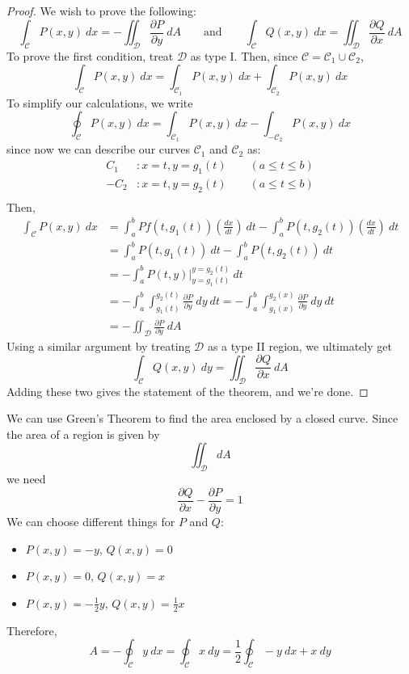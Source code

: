 \documentclass[12pt]{article}
\begin{document}
\begin{proof}
We wish to prove the following:
\[ \int_{\mathcal{C}}P(x,y) \ dx = - \iint_{\mathcal{D}} \frac{\partial P}{\partial y} \ dA \qquad \text{and} \qquad \int_{\mathcal{C}}Q(x,y) \ dx = \iint_{\mathcal{D}}\frac{\partial Q}{\partial x} \ dA \]
To prove the first condition, treat $\mathcal{D}$ as type I. Then, since $\mathcal{C} = \mathcal{C}_1 \cup \mathcal{C}_2$, \[ \int_{\mathcal{C}}P(x,y) \ dx = \int_{\mathcal{C}_1}P(x,y) \ dx + \int_{\mathcal{C}_2}P(x,y) \ dx \]
To simplify our calculations, we write \[ \oint_{\mathcal{C}}P(x,y) \ dx = \int_{\mathcal{C}_1}P(x,y) \ dx - \int_{-\mathcal{C}_2}P(x,y) \ dx \]
since now we can describe our curves $\mathcal{C}_1$ and $\mathcal{C}_2$ as:
\[
\begin{aligned}
C_1&: x = t, y = g_1(t) \qquad (a \le t \le b) \\
-C_2&: x = t, y = g_2(t) \qquad (a \le t \le b) \\
\end{aligned}
\]
Then,
\[
\begin{aligned}
\int_{\mathcal{C}}P(x,y) \ dx &= \int_a^bPf(t,g_1(t)) \left(\frac{dx}{dt}\right) \ dt - \int_a^b P(t,g_2(t))\left(\frac{dx}{dt}\right) \ dt \\
&= \int_a^b P(t,g_1(t)) \ dt - \int_a^b P(t,g_2(t)) \ dt \\
&= -\int_a^b P(t,y)\biggl|_{y=g_1(t)}^{y=g_2(t)} \ dt \\
&= -\int_a^b \int_{g_1(t)}^{g_2(t)}\frac{\partial P}{\partial y} \ dy \ dt = -\int_a^b \int_{g_1(x)}^{g_2(x)}\frac{\partial P}{\partial y} \ dy \ dt \\
&= -\iint_{\mathcal{D}}\frac{\partial P}{\partial y} \ dA
\end{aligned}
\]
Using a similar argument by treating $\mathcal{D}$ as a type II region, we ultimately get \[ \int_{\mathcal{C}}Q(x,y) \ dy = \iint_{\mathcal{D}}\frac{\partial Q}{\partial x} \ dA \]
Adding these two gives the statement of the theorem, and we're done. 
\end{proof}

We can use Green's Theorem to find the area enclosed by a closed curve. Since the area of a region is given by \[ \iint_{\mathcal{D}}dA \] we need \[ \frac{\partial Q}{\partial x} - \frac{\partial P}{\partial y} = 1 \]
We can choose different things for $P$ and $Q$:
\begin{itemize}
\item $P(x,y) = -y$, $Q(x,y) = 0$ 
\item $P(x,y) = 0$, $Q(x,y) = x$
\item $P(x,y) = -\frac{1}{2}y$, $Q(x,y) = \frac{1}{2}x$
\end{itemize}
Therefore,
\[ \boxed{A = -\oint_{\mathcal{C}}y \ dx = \oint_{\mathcal{C}}x \ dy = \frac{1}{2}\oint_{\mathcal{C}}-y \ dx + x \ dy} \]
\end{document}
